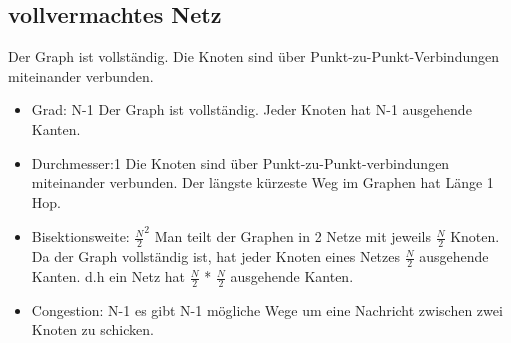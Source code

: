 \subsection{vollvermachtes Netz}
Der Graph ist vollständig. Die Knoten sind über Punkt-zu-Punkt-Verbindungen miteinander verbunden.
\begin{itemize}
  \item Grad: N-1
  \newline Der Graph ist vollständig. Jeder Knoten hat N-1 ausgehende Kanten.
  \item Durchmesser:1
   \newline Die Knoten sind über Punkt-zu-Punkt-verbindungen miteinander verbunden. Der längste kürzeste Weg  im Graphen hat Länge 1 Hop.
  \item Bisektionsweite: 
$ \frac{N}{2}^2$
  \newline Man teilt der Graphen in 2 Netze mit jeweils $\frac{N}{2}$ Knoten. Da der Graph vollständig ist, hat jeder Knoten eines Netzes  $\frac{N}{2}$ ausgehende Kanten. d.h ein Netz hat $\frac{N}{2}$ * $\frac{N}{2}$ ausgehende Kanten. 
  \item Congestion: N-1
  \newline es gibt N-1 mögliche Wege um eine Nachricht zwischen zwei Knoten zu schicken.
\end{itemize}
